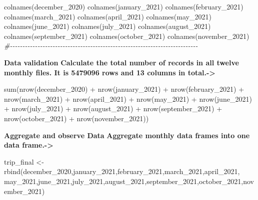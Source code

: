 \documentclass[
]{article}
\newenvironment{Shaded}{\begin{snugshade}}{\end{snugshade}}
\newcommand{\CommentTok}[1]{\textcolor[rgb]{0.56,0.35,0.01}{\textit{#1}}}
\newcommand{\FunctionTok}[1]{\textcolor[rgb]{0.00,0.00,0.00}{#1}}
\newcommand{\NormalTok}[1]{#1}
\newcommand{\OtherTok}[1]{\textcolor[rgb]{0.56,0.35,0.01}{#1}}
\newcommand{\SpecialCharTok}[1]{\textcolor[rgb]{0.00,0.00,0.00}{#1}}
\begin{document}
\begin{Shaded}
\begin{Highlighting}[]
\FunctionTok{colnames}\NormalTok{(december\_2020)}
\FunctionTok{colnames}\NormalTok{(january\_2021)}
\FunctionTok{colnames}\NormalTok{(february\_2021)}
\FunctionTok{colnames}\NormalTok{(march\_2021)}
\FunctionTok{colnames}\NormalTok{(april\_2021)}
\FunctionTok{colnames}\NormalTok{(may\_2021)}
\FunctionTok{colnames}\NormalTok{(june\_2021)}
\FunctionTok{colnames}\NormalTok{(july\_2021)}
\FunctionTok{colnames}\NormalTok{(august\_2021)}
\FunctionTok{colnames}\NormalTok{(september\_2021)}
\FunctionTok{colnames}\NormalTok{(october\_2021)}
\FunctionTok{colnames}\NormalTok{(november\_2021)}
\CommentTok{\#{-}{-}{-}{-}{-}{-}{-}{-}{-}{-}{-}{-}{-}{-}{-}{-}{-}{-}{-}{-}{-}{-}{-}{-}{-}{-}{-}{-}{-}{-}{-}{-}{-}{-}{-}{-}{-}{-}{-}{-}{-}{-}{-}{-}{-}{-}{-}{-}{-}{-}{-}{-}{-}{-}{-}{-}{-}{-}{-}{-}{-}{-}{-}{-}{-}{-}{-}{-}{-}{-}{-}{-}{-}{-}{-}}
\end{Highlighting}
\end{Shaded}

\textbf{Data validation} \textbf{Calculate the total number of records
in all twelve monthly files. It is 5479096 rows and 13 columns in
total.-\textgreater{}}

\begin{Shaded}
\begin{Highlighting}[]
\FunctionTok{sum}\NormalTok{(}\FunctionTok{nrow}\NormalTok{(december\_2020) }\SpecialCharTok{+} \FunctionTok{nrow}\NormalTok{(january\_2021) }\SpecialCharTok{+} \FunctionTok{nrow}\NormalTok{(february\_2021) }
    \SpecialCharTok{+} \FunctionTok{nrow}\NormalTok{(march\_2021) }\SpecialCharTok{+} \FunctionTok{nrow}\NormalTok{(april\_2021) }\SpecialCharTok{+} \FunctionTok{nrow}\NormalTok{(may\_2021) }
    \SpecialCharTok{+} \FunctionTok{nrow}\NormalTok{(june\_2021) }\SpecialCharTok{+} \FunctionTok{nrow}\NormalTok{(july\_2021) }\SpecialCharTok{+} \FunctionTok{nrow}\NormalTok{(august\_2021)}
    \SpecialCharTok{+} \FunctionTok{nrow}\NormalTok{(september\_2021) }\SpecialCharTok{+} \FunctionTok{nrow}\NormalTok{(october\_2021) }\SpecialCharTok{+} \FunctionTok{nrow}\NormalTok{(november\_2021))}
\end{Highlighting}
\end{Shaded}

\textbf{Aggregate and observe Data} \textbf{Aggregate monthly data
frames into one data frame.-\textgreater{}}

\begin{Shaded}
\begin{Highlighting}[]
\NormalTok{trip\_final }\OtherTok{\textless{}{-}} \FunctionTok{rbind}\NormalTok{(december\_2020,january\_2021,february\_2021,march\_2021,april\_2021,}
\NormalTok{                    may\_2021,june\_2021,july\_2021,august\_2021,september\_2021,october\_2021,november\_2021)}
\end{Highlighting}
\end{Shaded}
\end{document}
